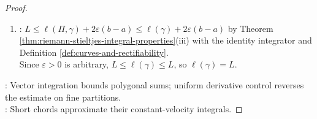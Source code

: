 \begin{theorem}
\begin{proof}
\begin{enumerate}[label=(\roman*)]
The identities $(\forall i\in\{1,\ldots,n\})\,\mathbf{v}_i\Delta x_i-\Delta\gamma_i=\int_{x_{i-1}}^{x_i}[\mathbf{v}_i-\gamma'(t)]\,dt$ hold by Theorem \ref{thm:vector-valued-integral-results}(i).\\
Hence $(\forall i\in\{1,\ldots,n\})\,\norm{\mathbf{v}_i\Delta x_i-\Delta\gamma_i}\leq\varepsilon\Delta x_i$ by Theorem \ref{thm:vector-valued-integral-results}(iii), Theorem \ref{thm:riemann-stieltjes-integral-properties}(ii), and the pointwise bound.\\
The bounds $(\forall i\in\{1,\ldots,n\})(\forall t\in[x_{i-1},x_i])\,\rho(t)\leq\norm{\mathbf{v}_i}+\varepsilon$ hold by Theorem \ref{thm:triangle-inequality-inner-product}(i).\\
Thus $(\forall i\in\{1,\ldots,n\})\,\int_{x_{i-1}}^{x_i}\rho(t)\,dt\leq\norm{\Delta\gamma_i}+2\varepsilon\Delta x_i$ by Theorem \ref{thm:riemann-stieltjes-integral-properties}(ii), Theorem \ref{thm:triangle-inequality-inner-product}(i), and the preceding bound.
\item {}: $L\leq\ell(\Pi,\gamma)+2\varepsilon(b-a)\leq\ell(\gamma)+2\varepsilon(b-a)$ by Theorem \ref{thm:riemann-stieltjes-integral-properties}(iii) with the identity integrator and Definition \ref{def:curves-and-rectifiability}.\\
Since $\varepsilon>0$ is arbitrary, $L\leq\ell(\gamma)\leq L$, so $\ell(\gamma)=L$.
\end{enumerate}
: Vector integration bounds polygonal sums; uniform derivative control reverses the estimate on fine partitions.\\
: Short chords approximate their constant-velocity integrals.
\end{proof}
\end{theorem}
